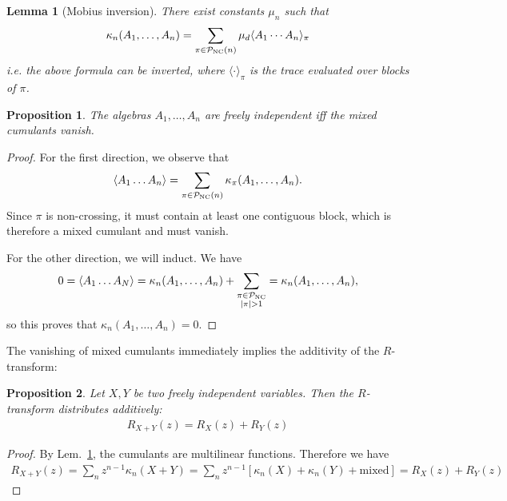 \documentclass[11pt]{article}
\newtheorem{lemma}{Lemma}[section]
\newtheorem{prop}{Proposition}[section]
\theoremstyle{definition}
\begin{document}
\begin{lemma}[Mobius inversion]\label{lem:Mobius}
There exist constants $\mu_n$ such that
\begin{align}
\kappa_n(A_1, \ldots, A_n) = \sum_{\pi \in \mathcal P_{\rm{NC}}(n)}\mu_d \langle A_1\cdots A_n\rangle_\pi
\end{align}
i.e. the above formula can be inverted, where $\langle \cdot \rangle_\pi$ is the trace evaluated over blocks of $\pi$.
\end{lemma}
\begin{prop}
The algebras $A_1, \ldots, A_n$ are freely independent iff the mixed cumulants vanish.
\end{prop}
\begin{proof}
For the first direction, we observe that
\begin{align}
\langle A_1\ldots A_n\rangle = \sum_{\pi \in \mathcal P_{\rm{NC}}(n)}\kappa_\pi(A_1, \ldots, A_n).
\end{align}
Since $\pi$ is non-crossing, it must contain at least one contiguous block, which is therefore a mixed cumulant and must vanish.

For the other direction, we will induct. We have
\begin{align}
0 = \langle A_1\ldots A_N \rangle = \kappa_n(A_1, \ldots, A_n) + \sum_{\substack{\pi \in \mathcal P_{\rm{NC}}\\ |\pi| > 1}} = \kappa_n(A_1, \ldots, A_n),
\end{align}
so this proves that $\kappa_n(A_1, \ldots, A_n) = 0$. 
\end{proof}


The vanishing of mixed cumulants immediately implies the additivity of the $R$-transform:
\begin{prop}
Let $X,Y$ be two freely independent variables. Then the $R$-transform distributes additively:
\begin{align}
R_{X+Y}(z) = R_X(z) + R_Y(z)
\end{align}
\end{prop}
\begin{proof}
By Lem.~\ref{lem:Mobius}, the cumulants are multilinear functions. Therefore we have
\begin{align}
R_{X+Y}(z) = \sum_{n}z^{n-1}\kappa_n(X+Y) = \sum_{n}z^{n-1}[\kappa_n(X) + \kappa_n(Y) + \text{mixed}] = R_X(z) + R_Y(z)
\end{align}
\end{proof}
\end{document}

